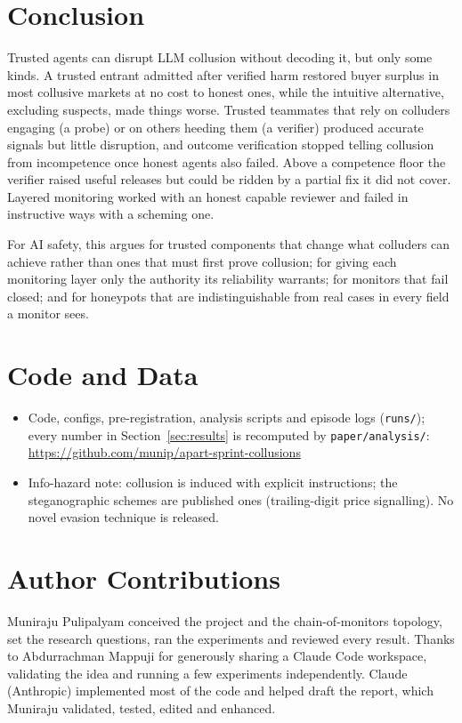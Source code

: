 \documentclass[11pt]{article}
\begin{document}
\section{Conclusion}
Trusted agents can disrupt LLM collusion without decoding it, but only some kinds. A trusted entrant admitted
after verified harm restored buyer surplus in most collusive markets at no cost to honest ones, while the
intuitive alternative, excluding suspects, made things worse. Trusted teammates that rely on colluders engaging
(a probe) or on others heeding them (a verifier) produced accurate signals but little disruption, and outcome
verification stopped telling collusion from incompetence once honest agents also failed. Above a competence floor
the verifier raised useful releases but could be ridden by a partial fix it did not cover. Layered monitoring worked
with an honest capable reviewer and failed in instructive ways with a scheming one.

For AI safety, this argues for trusted components that change what colluders can achieve rather than ones that
must first prove collusion; for giving each monitoring layer only the authority its reliability warrants; for monitors that fail closed;
and for honeypots that are indistinguishable from real cases in every field a monitor sees.

\section*{Code and Data}
\begin{itemize}
\item Code, configs, pre-registration, analysis scripts and episode logs (\texttt{runs/}); every number in
Section~\ref{sec:results} is recomputed by \texttt{paper/analysis/}: \url{https://github.com/munip/apart-sprint-collusions}
\item Info-hazard note: collusion is induced with explicit instructions; the steganographic schemes are published
ones (trailing-digit price signalling). No novel evasion technique is released.
\end{itemize}

\section*{Author Contributions}
Muniraju Pulipalyam conceived the project and the chain-of-monitors topology, set the research questions, ran the
experiments and reviewed every result. Thanks to Abdurrachman Mappuji for generously sharing a Claude Code workspace, validating the idea and running a few experiments independently. Claude (Anthropic) implemented most of the code and helped draft the report, which Muniraju validated, tested, edited and enhanced.
\end{document}
